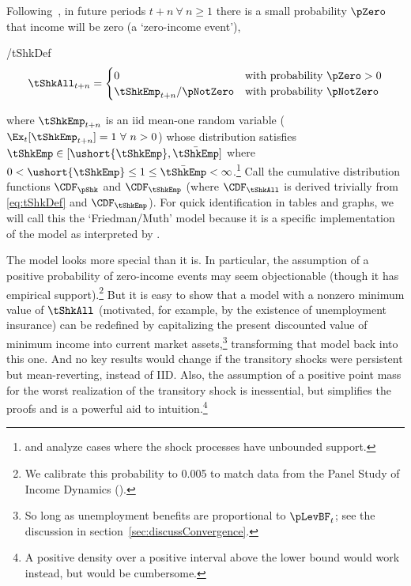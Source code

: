 \documentclass[BufferStockTheory]{subfiles}
\providecommand{\LtxDir}{LaTeX/}
\begin{document}
Following~\cite{zeldesStochastic}, in future periods $t+n ~\forall~ n \geq 1$ there is a small probability $\pZero$ that income will be zero (a `zero-income event'),
\begin{verbatimwrite}{\EqDir/tShkDef}
  \begin{equation}
    \tShkAll _{t+n}=
    \begin{cases}
      0\phantom{_{t+1}/\pNotZero} & \text{with probability $\pZero>0$} \\
      \tShkEmp_{t+n}/\pNotZero      & \text{with probability $\pNotZero  $} %
    \end{cases} \label{eq:tShkDef}
  \end{equation}
\end{verbatimwrite}

where $\tShkEmp_{t+n}$ is an iid mean-one random variable
($\Ex_{t}[{\tShkEmp}_{t+n}]=1~\forall~n>0$)
whose distribution satisfies $\tShkEmp \in \lbrack \ushort{\tShkEmp},\bar{\tShkEmp}\rbrack$
where $0<\ushort{\tShkEmp} \leq 1 \leq \bar{\tShkEmp}<\infty$.\footnote{\cite{rabaultBorrowing} and \cite{lsIncFluct} analyze cases where the shock processes have unbounded support.}  Call the cumulative
distribution functions $\CDF_{\pShk}$ and $\CDF_{\tShkEmp}$ (where $\CDF_{\tShkAll}$
 is derived trivially from \eqref{eq:tShkDef} and $\CDF_{\tShkEmp}$).  For quick identification in tables and graphs, we will call this the `Friedman/Muth' model because it is a specific implementation of the \cite{friedmanATheory} model as interpreted by \cite{muthOptimal}.%

\hypertarget{PDV}{}
The model looks more special than it is.  In particular, the
assumption of a positive probability of zero-income events may seem
objectionable (though it has empirical support).\footnote{We calibrate this probability to 0.005 to match data from the Panel Study of Income Dynamics (\cite{carrollBrookings}).}
But it is easy to show that a model with a
nonzero minimum value of $\tShkAll$ (motivated, for example, by the
existence of unemployment insurance) can be redefined by capitalizing
the present discounted value of minimum income into current market assets,\footnote{So long
  as unemployment benefits are
  proportional to $\pLevBF_{t}$; see the discussion in
  section~\ref{sec:discussConvergence}.}  transforming
that model back into this one.  And no key results would change if the transitory shocks were persistent but mean-reverting, instead of IID.  Also, the assumption of a positive point mass for the worst realization of the transitory shock is inessential, but simplifies the proofs and is a powerful aid to intuition.\footnote{A  positive density over a positive interval above the lower bound would work instead, but would be cumbersome.}
\end{document}
